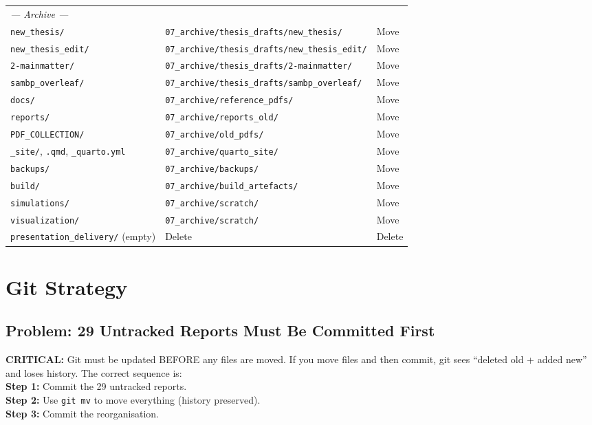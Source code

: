 \documentclass[11pt,a4paper]{article}
\newcommand{\cmd}[1]{\texttt{\small #1}}
\begin{document}
\begin{longtable}{p{5.2cm}p{6.8cm}l}
\multicolumn{3}{l}{\textit{--- Archive ---}} \\
\cmd{new\_thesis/} & \cmd{07\_archive/thesis\_drafts/new\_thesis/} & Move \\
\cmd{new\_thesis\_edit/} & \cmd{07\_archive/thesis\_drafts/new\_thesis\_edit/} & Move \\
\cmd{2-mainmatter/} & \cmd{07\_archive/thesis\_drafts/2-mainmatter/} & Move \\
\cmd{sambp\_overleaf/} & \cmd{07\_archive/thesis\_drafts/sambp\_overleaf/} & Move \\
\cmd{docs/} & \cmd{07\_archive/reference\_pdfs/} & Move \\
\cmd{reports/} & \cmd{07\_archive/reports\_old/} & Move \\
\cmd{PDF\_COLLECTION/} & \cmd{07\_archive/old\_pdfs/} & Move \\
\cmd{\_site/}, \cmd{*.qmd}, \cmd{\_quarto.yml} & \cmd{07\_archive/quarto\_site/} & Move \\
\cmd{backups/} & \cmd{07\_archive/backups/} & Move \\
\cmd{build/} & \cmd{07\_archive/build\_artefacts/} & Move \\
\cmd{simulations/} & \cmd{07\_archive/scratch/} & Move \\
\cmd{visualization/} & \cmd{07\_archive/scratch/} & Move \\
\cmd{presentation\_delivery/} (empty) & Delete & Delete \\
\bottomrule
\end{longtable}

\newpage
\section{Git Strategy}

\subsection{Problem: 29 Untracked Reports Must Be Committed First}

\begin{redbox}
\textbf{CRITICAL:} Git must be updated BEFORE any files are moved.
If you move files and then commit, git sees ``deleted old + added new'' and
loses history. The correct sequence is:\\[4pt]
\textbf{Step 1:} Commit the 29 untracked reports.\\
\textbf{Step 2:} Use \cmd{git mv} to move everything (history preserved).\\
\textbf{Step 3:} Commit the reorganisation.
\end{redbox}
\end{document}

